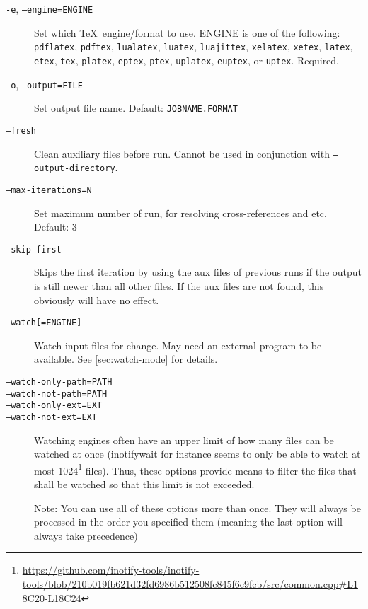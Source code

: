 \documentclass[a4paper]{report}
\newcommand\metavar[1]{\textnormal{\textsf{#1}}}
\begin{document}
\begin{description}
\item[\texttt{-e}, \texttt{--engine=\metavar{ENGINE}}]
  Set which \TeX\ engine/format to use.
  \metavar{ENGINE} is one of the following:
  \texttt{pdflatex}, \texttt{pdftex},
  \texttt{lualatex}, \texttt{luatex}, \texttt{luajittex},
  \texttt{xelatex}, \texttt{xetex},
  \texttt{latex}, \texttt{etex}, \texttt{tex},
  \texttt{platex}, \texttt{eptex}, \texttt{ptex},
  \texttt{uplatex}, \texttt{euptex}, or \texttt{uptex}.
  Required.
\item[\texttt{-o}, \texttt{--output=\metavar{FILE}}]
  Set output file name.
  Default: \texttt{\metavar{JOBNAME}.\metavar{FORMAT}}
\item[\texttt{--fresh}]
  Clean auxiliary files before run.
  Cannot be used in conjunction with \texttt{--output-directory}.
\item[\texttt{--max-iterations=\metavar{N}}]
  Set maximum number of run, for resolving cross-references and etc.
  Default: 3
\item[\texttt{--skip-first}]
  Skips the first iteration by using the aux files of previous runs if the
  output is still newer than all other files. If the aux files are not found,
  this obviously will have no effect.
\item[\texttt{--watch[=\metavar{ENGINE}]}]
  Watch input files for change.
  May need an external program to be available.
  See \autoref{sec:watch-mode} for details.
\item[\texttt{--watch-only-path=\metavar{PATH}}]
\item[\texttt{--watch-not-path=\metavar{PATH}}]
\item[\texttt{--watch-only-ext=\metavar{EXT}}]
\item[\texttt{--watch-not-ext=\metavar{EXT}}]
  Watching engines often have an upper limit of how many files can be watched at once
  (inotifywait for instance seems to only be able to watch at most 1024\footnote{\url{https://github.com/inotify-tools/inotify-tools/blob/210b019fb621d32fd6986b512508fc845f6c9fcb/src/common.cpp\#L18C20-L18C24}} files). Thus, these options provide means to filter the files that shall be watched so that this limit is not exceeded.

  Note: You can use all of these options more than once.
  They will always be processed in the order you specified them (meaning the last option will always take precedence)


\end{description}
\end{document}
